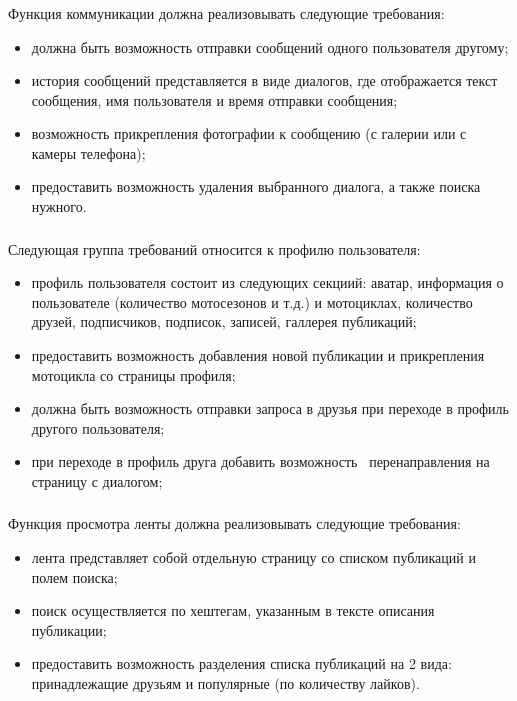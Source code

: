 \subsubsection{}
\label{sec:domain:specification:messages}

Функция коммуникации должна реализовывать следующие требования:
\begin{itemize}
	\item должна быть возможность отправки сообщений одного пользователя другому;
	\item история сообщений представляется в виде диалогов, где отображается текст сообщения, имя пользователя и время отправки сообщения;
	\item возможность прикрепления фотографии к сообщению (с галерии или с камеры телефона);
	\item предоставить возможность удаления выбранного диалога, а также поиска нужного.
\end{itemize}

\subsubsection{}
\label{sec:domain:specification:student_history}

Следующая группа требований относится к профилю пользователя:
\begin{itemize}
	\item профиль пользователя состоит из следующих секциий: аватар, информация о пользователе (количество мотосезонов и т.д.) и мотоциклах, количество друзей, подписчиков, подписок, записей, галлерея публикаций;
	\item предоставить возможность добавления новой публикации и прикрепления мотоцикла со страницы профиля;
	\item должна быть возможность отправки запроса в друзья при переходе в профиль другого пользователя;
	\item при переходе в профиль друга добавить возможность  перенаправления на страницу с диалогом;
\end{itemize}

\subsubsection{}
\label{sec:domain:specification:student_history}

Функция просмотра ленты должна реализовывать следующие требования:
\begin{itemize}
	\item лента представляет собой отдельную страницу со списком публикаций и полем поиска;
	\item поиск осуществляется по хештегам, указанным в тексте описания публикации;
	\item предоставить возможность разделения списка публикаций на 2 вида: принадлежащие друзьям и популярные (по количеству лайков).
\end{itemize}


